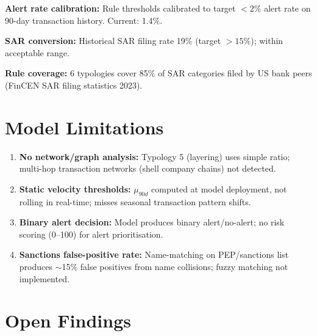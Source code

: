 \documentclass{apex_mdd}
\begin{document}
\textbf{Alert rate calibration:} Rule thresholds calibrated to target $<2\%$ alert rate on 90-day transaction history. Current: 1.4\%.

\textbf{SAR conversion:} Historical SAR filing rate 19\% (target $>15\%$); within acceptable range.

\textbf{Rule coverage:} 6 typologies cover 85\% of SAR categories filed by US bank peers (FinCEN SAR filing statistics 2023).

\section{Model Limitations}

\begin{enumerate}
  \item \textbf{No network/graph analysis:} Typology 5 (layering) uses simple ratio; multi-hop transaction networks (shell company chains) not detected.
  \item \textbf{Static velocity thresholds:} $\mu_{90d}$ computed at model deployment, not rolling in real-time; misses seasonal transaction pattern shifts.
  \item \textbf{Binary alert decision:} Model produces binary alert/no-alert; no risk scoring (0--100) for alert prioritisation.
  \item \textbf{Sanctions false-positive rate:} Name-matching on PEP/sanctions list produces $\sim$15\% false positives from name collisions; fuzzy matching not implemented.
\end{enumerate}

\section{Open Findings}

\begin{findings}
\end{findings}
\end{document}
